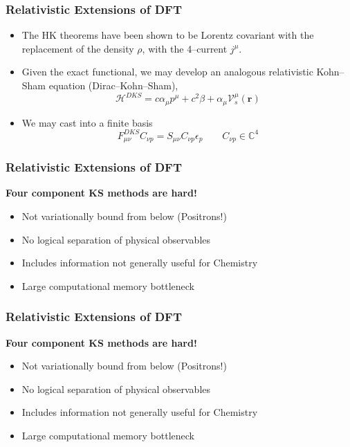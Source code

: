 \documentclass{beamer}
\begin{document}
\begin{frame}
\frametitle{Relativistic Extensions of DFT}

\begin{itemize}
  \item The HK theorems have been shown to be Lorentz covariant with the replacement
  of the density $\rho$, with the 4--current $j^\mu$.

  \item Given the exact functional, we may develop an analogous relativistic Kohn--Sham
  equation (Dirac--Kohn--Sham),
  \begin{equation*}
    \mathcal{H}^{DKS} = c\alpha_\mu p^\mu + c^2\beta + \alpha_\mu \mathcal{V}_s^\mu(\mathbf{r})
  \end{equation*}

  \item We may cast into a finite basis
  \begin{equation*}
    F_{\mu\nu}^{DKS} C_{\nu p} = S_{\mu\nu}C_{\nu p} \epsilon_p \qquad C_{\nu p} \in \mathbb{C}^4
  \end{equation*}
\end{itemize}
\end{frame}

\begin{frame}
\frametitle{Relativistic Extensions of DFT}

\begin{center} \bf \LARGE Four component KS methods are hard! \end{center}
\begin{itemize}
  \color{white}
  \item[\color{white}] Not variationally bound from below (Positrons!)
  \item[\color{white}] No logical separation of physical observables
  \item[\color{white}] Includes information not generally useful for Chemistry
  \item[\color{white}] Large computational memory bottleneck
\end{itemize}

\end{frame}

\begin{frame}
\frametitle{Relativistic Extensions of DFT}

\begin{center} \bf \LARGE Four component KS methods are hard! \end{center}
\begin{itemize}
  \item Not variationally bound from below (Positrons!)
  \color{white}
  \item[\color{white}] No logical separation of physical observables
  \item[\color{white}] Includes information not generally useful for Chemistry
  \item[\color{white}] Large computational memory bottleneck
\end{itemize}

\end{frame}
\end{document}

